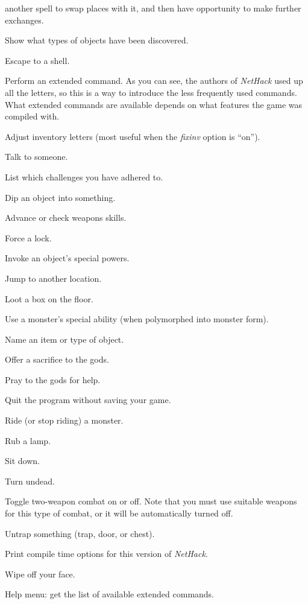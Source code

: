 another spell to swap places with it, and then have opportunity to
make further exchanges.
\item[\tb{$\backslash$}]
Show what types of objects have been discovered.
\item[\tb{!}]
Escape to a shell.
\item[\tb{\#}]
Perform an extended command.  As you can see, the authors of {\it NetHack\/}
used up all the letters, so this is a way to introduce the less frequently
used commands.
What extended commands are available depends on what features
the game was compiled with.
\item[\tb{\#adjust}]
Adjust inventory letters (most useful when the
{\it fixinv\/}
option is ``on'').
\item[\tb{\#chat}]
Talk to someone.
\item[\tb{\#conduct}]
List which challenges you have adhered to.
\item[\tb{\#dip}]
Dip an object into something.
\item[\tb{\#enhance}]
Advance or check weapons skills.
\item[\tb{\#force}]
Force a lock.
\item[\tb{\#invoke}]
Invoke an object's special powers.
\item[\tb{\#jump}]
Jump to another location.
\item[\tb{\#loot}]
Loot a box on the floor.
\item[\tb{\#monster}]
Use a monster's special ability (when polymorphed into monster form).
\item[\tb{\#name}]
Name an item or type of object.
\item[\tb{\#offer}]
Offer a sacrifice to the gods.
\item[\tb{\#pray}]
Pray to the gods for help.
\item[\tb{\#quit}]
Quit the program without saving your game.
\item[\tb{\#ride}]
Ride (or stop riding) a monster.
\item[\tb{\#rub}]
Rub a lamp.
\item[\tb{\#sit}]
Sit down.
\item[\tb{\#turn}]
Turn undead.
\item[\tb{\#twoweapon}]
Toggle two-weapon combat on or off.  Note that you must
use suitable weapons for this type of combat, or it will
be automatically turned off.
\item[\tb{\#untrap}]
Untrap something (trap, door, or chest).
\item[\tb{\#version}]
Print compile time options for this version of {\it NetHack}.
\item[\tb{\#wipe}]
Wipe off your face.
\item[\tb{\#?}]
Help menu:  get the list of available extended commands.
\elist

